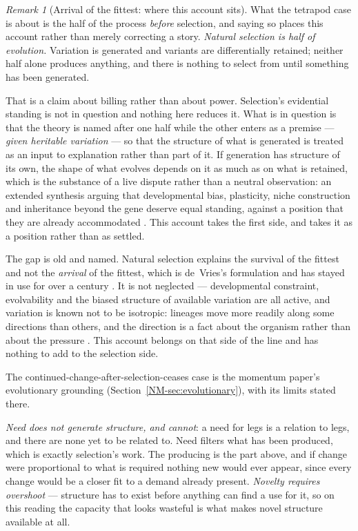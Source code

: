 \documentclass[11pt,a4paper]{article}
\theoremstyle{remark}
\newtheorem{remark}[definition]{Remark}
\begin{document}
\begin{remark}[Arrival of the fittest: where this account sits]\label{rem:arrival}
What the tetrapod case is about is the half of the process \emph{before} selection, and saying so places
this account rather than merely correcting a story. \emph{Natural selection is half of evolution.}
Variation is generated and variants are differentially retained; neither half alone produces
anything, and there is nothing to select from until something has been generated.

That is a claim about billing rather than about power. Selection's evidential standing is not in
question and nothing here reduces it. What is in question is that the theory is named after one half
while the other enters as a premise --- \emph{given heritable variation} --- so that the structure of
what is generated is treated as an input to explanation rather than part of it. If generation has
structure of its own, the shape of what evolves depends on it as much as on what is retained, which
is the substance of a live dispute rather than a neutral observation: an extended synthesis arguing
that developmental bias, plasticity, niche construction and inheritance beyond the gene deserve equal
standing, against a position that they are already accommodated \citep{laland2015}. This account
takes the first side, and takes it as a position rather than as settled.

The gap is old and named. Natural selection explains the survival of the fittest and not the
\emph{arrival} of the fittest, which is de~Vries's formulation and has stayed in use for over a
century \citep{devries1905,wagner2014}. It is not neglected --- developmental constraint, evolvability
and the biased structure of available variation are all active, and variation is known not to be
isotropic: lineages move more readily along some directions than others, and the direction is a fact
about the organism rather than about the pressure \citep{schluter1996}. This account belongs on that
side of the line and has nothing to add to the selection side.

The continued-change-after-selection-ceases case is the momentum paper's evolutionary grounding
(Section~\ref{NM-sec:evolutionary}), with its limits stated there.

\emph{Need does not generate structure, and cannot}: a need for legs is a relation to legs, and there
are none yet to be related to. Need filters what has been produced, which is exactly selection's
work. The producing is the part above, and if change were proportional to what is required nothing
new would ever appear, since every change would be a closer fit to a demand already present.
\emph{Novelty requires overshoot} --- structure has to exist before anything can find a use for it, so
on this reading the capacity that looks wasteful is what makes novel structure available at all.


\end{remark}
\end{document}

